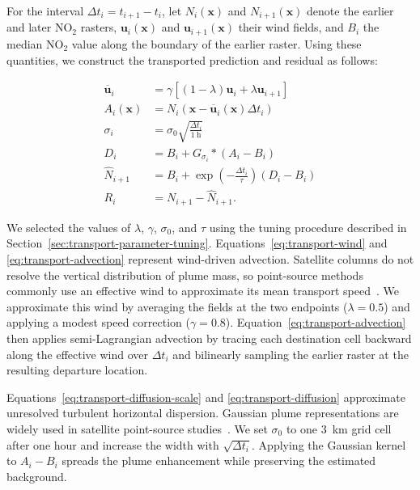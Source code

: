 \documentclass[sigconf,nonacm]{acmart}
\begin{document}
For the interval $\Delta t_i=t_{i+1}-t_i$, let $N_i(\boldsymbol{x})$ and
$N_{i+1}(\boldsymbol{x})$ denote the earlier and later NO$_2$ rasters,
$\boldsymbol{u}_i(\boldsymbol{x})$ and
$\boldsymbol{u}_{i+1}(\boldsymbol{x})$ their wind fields, and $B_i$ the median
NO$_2$ value along the boundary of the earlier raster.
Using these quantities, we construct the transported prediction and residual as
follows:

\begingroup
\makeatletter
\tagsleft@true
\makeatother
\begin{align}
  \overline{\boldsymbol{u}}_i
    &= \gamma\!\left[(1-\lambda)\boldsymbol{u}_i
       + \lambda\boldsymbol{u}_{i+1}\right]
       \tag{i}\label{eq:transport-wind} \\
  A_i(\boldsymbol{x})
    &= N_i\!\left(\boldsymbol{x}
       -\overline{\boldsymbol{u}}_i(\boldsymbol{x})\Delta t_i\right)
       \tag{ii}\label{eq:transport-advection} \\
  \sigma_i
    &= \sigma_0\sqrt{\frac{\Delta t_i}{1~\mathrm{h}}}
       \tag{iii}\label{eq:transport-diffusion-scale} \\
  D_i
    &= B_i+G_{\sigma_i}*(A_i-B_i)
       \tag{iv}\label{eq:transport-diffusion} \\
  \widehat{N}_{i+1}
    &= B_i+\exp\!\left(-\frac{\Delta t_i}{\tau}\right)(D_i-B_i)
       \tag{v}\label{eq:transport-decay} \\
  R_i
    &= N_{i+1}-\widehat{N}_{i+1}
       \tag{vi}\label{eq:transport-residual}.
\end{align}
\endgroup

We selected the values of $\lambda$, $\gamma$, $\sigma_0$, and $\tau$ using
the tuning procedure described in Section~\ref{sec:transport-parameter-tuning}.
Equations~\eqref{eq:transport-wind} and
\eqref{eq:transport-advection} represent wind-driven advection. Satellite
columns do not resolve the vertical distribution of plume mass, so
point-source methods commonly use an effective wind to approximate its mean
transport speed~\cite{santaren2025benchmarking,meier2024conversion}. We
approximate this wind by averaging the fields at the two endpoints
($\lambda=0.5$) and applying a modest speed correction ($\gamma=0.8$).
Equation~\eqref{eq:transport-advection} then applies semi-Lagrangian advection
by tracing each destination cell backward along the effective wind over
$\Delta t_i$ and bilinearly sampling the earlier raster at the resulting
departure location.

Equations~\eqref{eq:transport-diffusion-scale} and
\eqref{eq:transport-diffusion} approximate unresolved turbulent horizontal
dispersion. Gaussian plume representations are widely used in satellite
point-source studies~\cite{santaren2025benchmarking,meier2024conversion}. We
set $\sigma_0$ to one 3~km grid cell after one hour and increase the width with
$\sqrt{\Delta t_i}$. Applying the Gaussian
kernel to $A_i-B_i$ spreads the plume enhancement while preserving the
estimated background.
\end{document}
